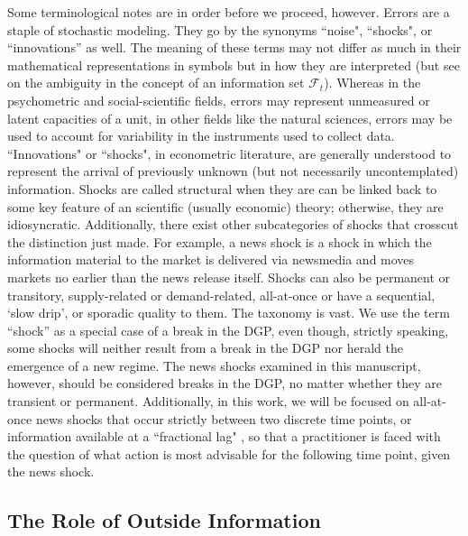 \documentclass{uiucthesis2021}
\theoremstyle{definition}
\begin{document}
   Some terminological notes are in order before we proceed, however.  Errors are a staple of stochastic modeling.  They go by the synonyms ``noise", ``shocks", or ``innovations'' as well.  The meaning of these terms may not differ as much in their mathematical representations in symbols but in how they are interpreted (but see \cite[][]{clements2005guest} on the ambiguity in the concept of an information set $\mathcal{F}_{t}$).  Whereas in the psychometric and social-scientific fields, errors may represent unmeasured or latent capacities of a unit, in other fields like the natural sciences, errors may be used to account for variability in the instruments used to collect data.  ``Innovations" or ``shocks", in econometric literature, are generally understood to represent the arrival of previously unknown (but not necessarily uncontemplated) information.  Shocks are called structural when they are can be linked back to some key feature of an scientific (usually economic) theory; otherwise, they are idiosyncratic.  Additionally, there exist other subcategories of shocks that crosscut the distinction just made.  For example, a news shock is a shock in which the information material to the market is delivered via newsmedia and moves markets no earlier than the news release itself.  Shocks can also be permanent or transitory, supply-related or demand-related, all-at-once or have a sequential, `slow drip', or sporadic quality to them.  The taxonomy is vast.  We use the term ``shock'' as a special case of a break in the DGP, even though, strictly speaking, some shocks will neither result from a break in the DGP nor herald the emergence of a new regime.  The news shocks examined in this manuscript, however, should be considered breaks in the DGP, no matter whether they are transient or permanent.  Additionally, in this work, we will be focused on all-at-once news shocks that occur strictly between two discrete time points, or information available at a ``fractional lag" \parencite{castle2011forecasting}, so that a practitioner is faced with the question of what action is most advisable for the following time point, given the news shock.
  
  \subsection{The Role of Outside Information}\label{outside_info}
  
\end{document}
